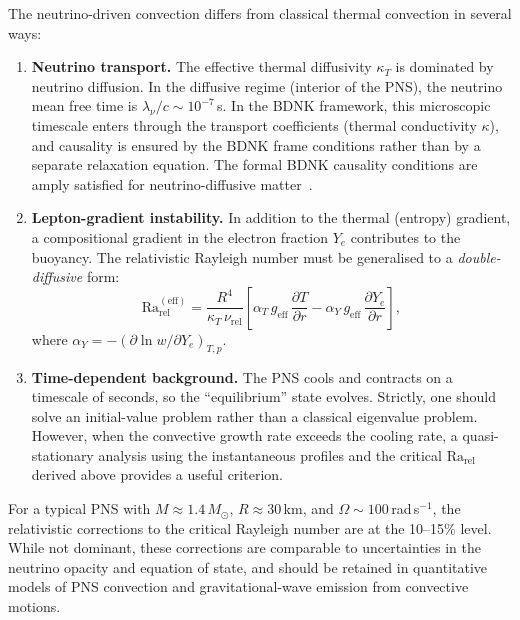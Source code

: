 The neutrino-driven convection differs from classical thermal
convection in several ways:
\begin{enumerate}
\item \textbf{Neutrino transport.}  The effective thermal
  diffusivity $\kappa_{T}$ is dominated by neutrino diffusion.
  In the diffusive regime (interior of the PNS), the neutrino mean
  free time is $\lambda_{\nu}/c \sim 10^{-7}$\,s.  In the BDNK
  framework, this microscopic timescale enters through the
  transport coefficients (thermal conductivity $\kappa$), and
  causality is ensured by the BDNK frame conditions rather than
  by a separate relaxation equation.  The formal BDNK causality
  conditions are amply satisfied for neutrino-diffusive
  matter~\cite{BemficaDN2018,Kovtun2019}.
\item \textbf{Lepton-gradient instability.}  In addition to the
  thermal (entropy) gradient, a compositional gradient in the
  electron fraction $Y_{e}$ contributes to the buoyancy.  The
  relativistic Rayleigh number must be generalised to a
  \emph{double-diffusive} form:
  \begin{equation}\label{eq:rel-6-Ra-PNS}
    \mathrm{Ra}_{\mathrm{rel}}^{(\mathrm{eff})}
    = \frac{R^{4}}{\kappa_{T}\,\nu_{\mathrm{rel}}}
      \left[
        \alpha_{T}\,g_{\mathrm{eff}}\,
        \frac{\partial T}{\partial r}
        - \alpha_{Y}\,g_{\mathrm{eff}}\,
        \frac{\partial Y_{e}}{\partial r}
      \right],
  \end{equation}
  where $\alpha_{Y} = -(\partial\ln w/\partial Y_{e})_{T,p}$.
\item \textbf{Time-dependent background.}  The PNS cools and
  contracts on a timescale of seconds, so the ``equilibrium'' state
  evolves.  Strictly, one should solve an initial-value problem
  rather than a classical eigenvalue problem.  However, when the
  convective growth rate exceeds the cooling rate, a
  quasi-stationary analysis using the instantaneous profiles
  and the critical $\mathrm{Ra}_{\mathrm{rel}}$ derived above
  provides a useful criterion.
\end{enumerate}

For a typical PNS with $M \approx 1.4\,M_{\odot}$,
$R \approx 30$\,km, and $\Omega \sim 100$\,rad\,s$^{-1}$, the
relativistic corrections to the critical Rayleigh number are at
the 10--15\% level.  While not dominant, these corrections are
comparable to uncertainties in the neutrino opacity and equation of
state, and should be retained in quantitative models of PNS
convection and gravitational-wave emission from convective
motions.

